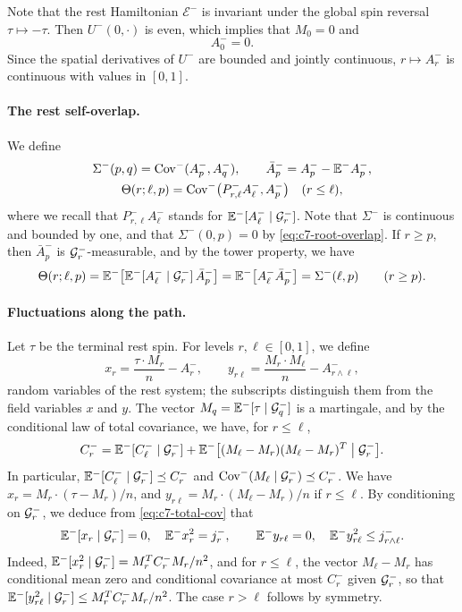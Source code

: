 Note that the rest Hamiltonian $\mathcal E^-$ is invariant under the
global spin reversal $\tau\mapsto-\tau$. Then $U^-(0,\cdot)$ is even,
which implies that $M_0=0$ and
\begin{equation}\label{eq:c7-root-overlap}
 A_0^-=0.
\end{equation}
Since the spatial derivatives of $U^-$ are bounded and jointly
continuous, $r\mapsto A_r^-$ is continuous with values in $[0,1]$.

\paragraph{The rest self-overlap.}
We define
\[
 \begin{gathered}
 \Sigma^-(p,q)=\operatorname{Cov}^-(A_p^-,A_q^-),\qquad
 \bar A_p^-=A_p^--\mathbb E^-A_p^-,\\
 \Theta(r;\ell,p)=\operatorname{Cov}^-\bigl(P^-_{r,\ell}A_\ell^-,A_p^-\bigr)
 \quad(r\le\ell),
 \end{gathered}
\]
where we recall that $P^-_{r,\ell}A_\ell^-$ stands for
$\mathbb E^-[A_\ell^-\mid\mathcal G^-_r]$. Note that $\Sigma^-$ is continuous and
bounded by one, and that $\Sigma^-(0,p)=0$ by
\eqref{eq:c7-root-overlap}. If $r\ge p$, then $\bar A_p^-$ is
$\mathcal G^-_r$-measurable, and by the tower property, we have
\begin{equation}\label{eq:c7-theta-past}
 \Theta(r;\ell,p)=\mathbb E^-\bigl[\mathbb E^-[A_\ell^-\mid\mathcal G^-_r]\,\bar A_p^-\bigr]
 =\mathbb E^-\bigl[A_\ell^-\bar A_p^-\bigr]=\Sigma^-(\ell,p)
 \qquad(r\ge p).
\end{equation}

\paragraph{Fluctuations along the path.}
Let $\tau$ be the terminal rest spin. For levels $r,\ell\in[0,1]$, we
define
\[
 x_r=\frac{\tau\cdot M_r}n-A_r^-,\qquad
 y_{r\ell}=\frac{M_r\cdot M_\ell}n-A_{r\wedge\ell}^-,
\]
random variables of the rest system; the subscripts distinguish them
from the field variables $x$ and $y$. The vector
$M_q=\mathbb E^-[\tau\mid\mathcal G^-_q]$ is a martingale, and by the conditional
law of total covariance, we have, for $r\le\ell$,
\begin{equation}\label{eq:c7-total-cov}
 C_r^-=\mathbb E^-[C_\ell^-\mid\mathcal G^-_r]
 +\mathbb E^-\bigl[(M_\ell-M_r)(M_\ell-M_r)^T\bigm|\mathcal G^-_r\bigr].
\end{equation}
In particular, $\mathbb E^-[C_\ell^-\mid\mathcal G^-_r]\preceq C_r^-$ and
$\operatorname{Cov}^-(M_\ell\mid\mathcal G^-_r)\preceq C_r^-$. We have
$x_r=M_r\cdot(\tau-M_r)/n$, and $y_{r\ell}=M_r\cdot(M_\ell-M_r)/n$ if
$r\le\ell$. By conditioning on $\mathcal G^-_r$, we deduce from
\eqref{eq:c7-total-cov} that
\begin{equation}\label{eq:cl-xy}
 \mathbb E^-[x_r\mid\mathcal G_r^-]=0,\quad \mathbb E^-x_r^2=j_r^-,\qquad
 \mathbb E^-y_{r\ell}=0,\quad \mathbb E^-y_{r\ell}^2\le j_{r\wedge\ell}^-.
\end{equation}
Indeed, $\mathbb E^-[x_r^2\mid\mathcal G^-_r]=M_r^TC_r^-M_r/n^2$, and for
$r\le\ell$, the vector $M_\ell-M_r$ has conditional mean zero and
conditional covariance at most $C_r^-$ given $\mathcal G^-_r$, so that
$\mathbb E^-[y_{r\ell}^2\mid\mathcal G^-_r]\le M_r^TC_r^-M_r/n^2$. The case
$r>\ell$ follows by symmetry.

